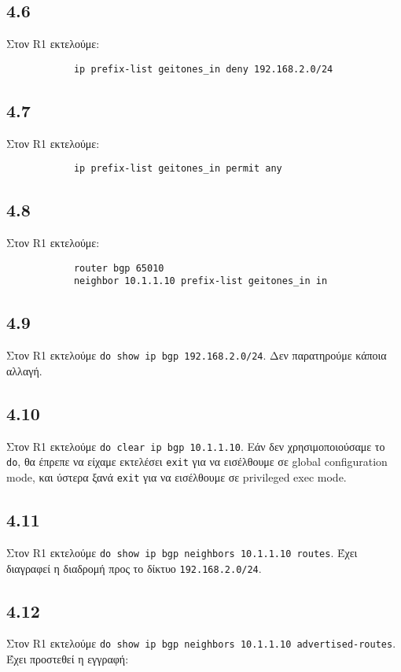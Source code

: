 \documentclass[a4paper, 12pt]{article}
\begin{document}
	\subsection*{4.6}
		Στον R1 εκτελούμε:
		
		\begin{verbatim}
			ip prefix-list geitones_in deny 192.168.2.0/24
		\end{verbatim}

	\subsection*{4.7}
		Στον R1 εκτελούμε:
		
		\begin{verbatim}
			ip prefix-list geitones_in permit any
		\end{verbatim}

	\subsection*{4.8}
		Στον R1 εκτελούμε:
		
		\begin{verbatim}
			router bgp 65010
			neighbor 10.1.1.10 prefix-list geitones_in in
		\end{verbatim}

	\subsection*{4.9}
		Στον R1 εκτελούμε \verb|do show ip bgp 192.168.2.0/24|. Δεν παρατηρούμε κάποια αλλαγή.

	\subsection*{4.10}
		Στον R1 εκτελούμε \verb|do clear ip bgp 10.1.1.10|. Εάν δεν χρησιμοποιούσαμε το \verb|do|, θα έπρεπε να είχαμε εκτελέσει \verb|exit| για να εισέλθουμε σε global configuration mode, και ύστερα ξανά \verb|exit| για να εισέλθουμε σε privileged exec mode.

	\subsection*{4.11}
		Στον R1 εκτελούμε \verb|do show ip bgp neighbors 10.1.1.10 routes|. Έχει διαγραφεί η διαδρομή προς το δίκτυο \verb|192.168.2.0/24|. 

	\subsection*{4.12}
		Στον R1 εκτελούμε \verb|do show ip bgp neighbors 10.1.1.10 advertised-routes|. Έχει προστεθεί η εγγραφή:
		
\end{document}
